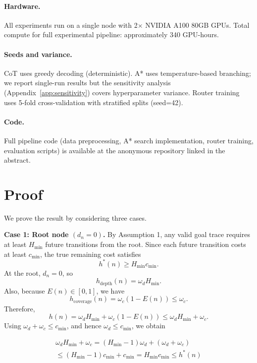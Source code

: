 \documentclass[10pt]{article}
\begin{document}
\paragraph{Hardware.} All experiments run on a single node with 2$\times$ NVIDIA A100 80GB GPUs. Total compute for full experimental pipeline: approximately 340 GPU-hours.

\paragraph{Seeds and variance.} CoT uses greedy decoding (deterministic). A* uses temperature-based branching; we report single-run results but the sensitivity analysis (Appendix~\ref{app:sensitivity}) covers hyperparameter variance. Router training uses 5-fold cross-validation with stratified splits (seed=42).

\paragraph{Code.} Full pipeline code (data preprocessing, A* search implementation, router training, evaluation scripts) is available at the anonymous repository linked in the abstract.




\section{Proof}\label{full-proof}

We prove the result by considering three cases.

\textbf{Case 1: Root node \((d_n=0)\).}
By Assumption 1, any valid goal trace requires at least \(H_{\min}\) future transitions from the root. Since each future transition costs at least \(c_{\min}\), the true remaining cost satisfies
\[
h^*(n) \geq H_{\min}c_{\min}.
\]
At the root, \(d_n=0\), so
\[
h_{\mathrm{depth}}(n)=\omega_d H_{\min}.
\]
Also, because \(E(n)\in[0,1]\), we have
\[
h_{\mathrm{coverage}}(n)=\omega_c(1-E(n)) \leq \omega_c.
\]
Therefore,
\[
h(n) = \omega_d H_{\min} + \omega_c(1-E(n))
      \leq \omega_d H_{\min} + \omega_c.
\]
Using \(\omega_d+\omega_c \leq c_{\min}\), and hence \(\omega_d \leq c_{\min}\), we obtain


\begin{multline}
    \omega_d H_{\min} + \omega_c
= (H_{\min}-1)\omega_d + (\omega_d+\omega_c) \\
\leq (H_{\min}-1)c_{\min}+c_{\min}
= H_{\min}c_{\min}
\leq h^*(n)
\end{multline}
\end{document}

